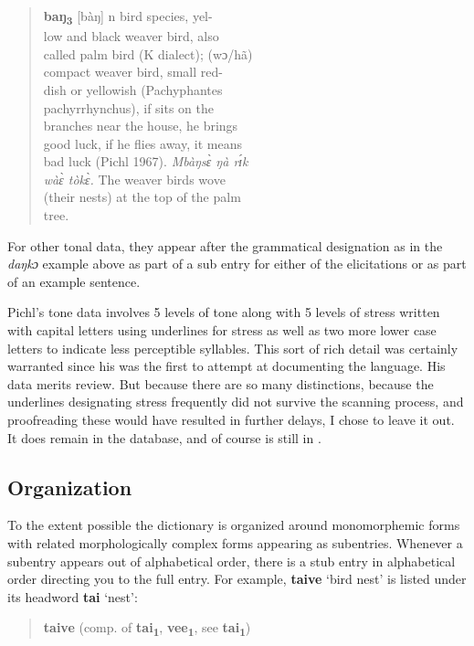 \begin{quote}
    \textbf{baŋ\textsubscript{3}} [bàŋ] n bird species, yel-\\
low and black weaver bird, also\\
called palm bird (K dialect); (wɔ/hã)\\
compact weaver bird, small red-\\
dish or yellowish (Pachyphantes\\
pachyrrhynchus), if sits on the\\
branches near the house, he brings\\
good luck, if he flies away, it means\\
bad luck (Pichl 1967). \textit{Mbàŋsɛ̀ ŋà rɪ́k}\\
\textit{wàɛ̀ tòkɛ̀.} The weaver birds wove\\
(their nests) at the top of the palm\\
tree.
\end{quote}

For other tonal data, they appear after the grammatical designation as in the \textit{daŋkɔ} example above as part of a sub entry for either of the elicitations or as part of an example sentence. 

Pichl’s tone data involves 5 levels of tone along with 5 levels of stress written with capital letters using underlines for stress as well as two more lower case letters to indicate less perceptible syllables. This sort of rich detail was certainly warranted since his was the first to attempt at documenting the language. His data merits review. But because there are so many distinctions, because the underlines designating stress frequently did not survive the scanning process, and proofreading these would have resulted in further delays, I chose to leave it out. It does remain in the database, and of course is still in \citet{Pichl1967}. 

 \subsection{Organization}
To the extent possible the dictionary is organized around monomorphemic forms with related morphologically complex forms appearing as subentries. Whenever a subentry appears out of alphabetical order, there is a stub entry in alphabetical order directing you to the full entry. For example, \textbf{taive} ‘bird nest’ is listed under its headword \textbf{tai} ‘nest’: 
\begin{quote}
    \TabPositions{1cm,2cm,5cm,7cm}
\vspace{6pt}
\small \textbf{taive} (comp. of \textbf{tai\textsubscript{1}}, \textbf{vee\textsubscript{1}}, see \textbf{tai\textsubscript{1}})
\end{quote}

